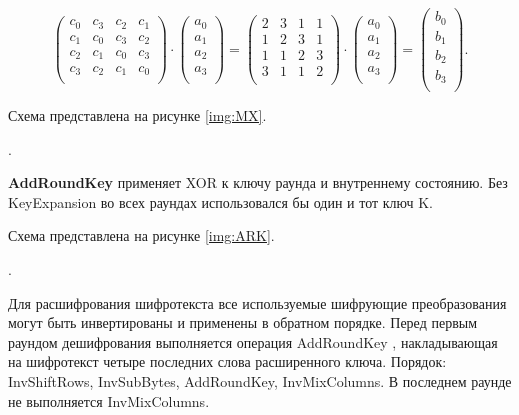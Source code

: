 \begin{equation*}
	\left(
	\begin{array}{cccc}
		c_0 & c_3 & c_2 & c_1\\
		c_1 & c_0 & c_3 & c_2\\
		c_2 & c_1 & c_0 & c_3\\
		c_3 & c_2 & c_1 & c_0\\
	\end{array}
	\right) 
	\cdot
	\left(
	\begin{array}{c}
		a_0\\
		a_1\\
		a_2\\
		a_3\\
	\end{array}
	\right)
	=
	\left(
	\begin{array}{cccc}
		2 & 3 & 1 & 1\\
		1 & 2 & 3 & 1\\
		1 & 1 & 2 & 3\\
		3 & 1 & 1 & 2\\
	\end{array}
	\right) 
	\cdot
	\left(
	\begin{array}{c}
		a_0\\
		a_1\\
		a_2\\
		a_3\\
	\end{array}
	\right)
	=
	\left(
	\begin{array}{c}
		b_0\\
		b_1\\
		b_2\\
		b_3\\
	\end{array}
	\right).
\end{equation*}

Схема представлена на рисунке \ref{img:MX}.

.
\FloatBarrier

\textbf{AddRoundKey} применяет XOR к ключу раунда и внутреннему состоянию. Без KeyExpansion во всех раундах использовался бы один и тот ключ K.

Схема представлена на рисунке \ref{img:ARK}.

.
\FloatBarrier

Для расшифрования шифротекста все используемые шифрующие преобразования могут быть инвертированы и применены в обратном порядке. Перед первым раундом дешифрования выполняется операция AddRoundKey , накладывающая на шифротекст четыре последних слова расширенного ключа. Порядок: InvShiftRows, InvSubBytes, AddRoundKey, InvMixColumns. В последнем раунде не выполняется InvMixColumns.

